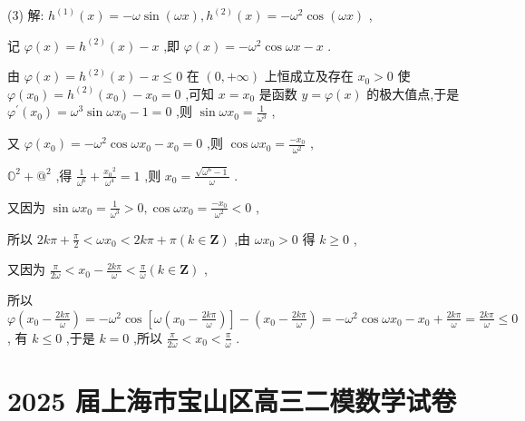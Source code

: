 \documentclass[10pt]{article}
\newcommand*\circled[1]{\tikz[baseline=(char.base)]{\node[shape=circle,draw,inner sep=1.5pt] (char) {\small #1};}}
\begin{document}
(3) 解: \({h}^{\left( 1\right) }\left( x\right)  =  - \omega \sin \left( {\omega x}\right) ,{h}^{\left( 2\right) }\left( x\right)  =  - {\omega }^{2}\cos \left( {\omega x}\right)\) ,

记 \(\varphi \left( x\right)  = {h}^{\left( 2\right) }\left( x\right)  - x\) ,即 \(\varphi \left( x\right)  =  - {\omega }^{2}\cos {\omega x} - x\) .

由 \(\varphi \left( x\right)  = {h}^{\left( 2\right) }\left( x\right)  - x \leq  0\) 在 \(\left( {0, + \infty }\right)\) 上恒成立及存在 \({x}_{0} > 0\) 使 \(\varphi \left( {x}_{0}\right)  = {h}^{\left( 2\right) }\left( {x}_{0}\right)  - {x}_{0} = 0\) ,可知 \(x = {x}_{0}\) 是函数 \(y = \varphi \left( x\right)\) 的极大值点,于是 \({\varphi }^{\prime }\left( {x}_{0}\right)  = {\omega }^{3}\sin \omega {x}_{0} - 1 = 0\) ,则 \(\sin \omega {x}_{0} = \frac{1}{{\omega }^{3}}\)  \circled{1} ,

又 \(\varphi \left( {x}_{0}\right)  =  - {\omega }^{2}\cos \omega {x}_{0} - {x}_{0} = 0\) ,则 \(\cos \omega {x}_{0} = \frac{-{x}_{0}}{{\omega }^{2}}\)  \circled{2} ,

\({\mathbb{O}}^{2} + {@}^{2}\) ,得 \(\frac{1}{{\omega }^{6}} + \frac{{x}_{0}{}^{2}}{{\omega }^{4}} = 1\) ,则 \({x}_{0} = \frac{\sqrt{{\omega }^{6} - 1}}{\omega }\) .

又因为 \(\sin \omega {x}_{0} = \frac{1}{{\omega }^{3}} > 0,\cos \omega {x}_{0} = \frac{-{x}_{0}}{{\omega }^{2}} < 0\) ,

所以 \({2k\pi } + \frac{\pi }{2} < \omega {x}_{0} < {2k\pi } + \pi \left( {k \in  \mathbf{Z}}\right)\) ,由 \(\omega {x}_{0} > 0\) 得 \(k \geq  0\) ,

又因为 \(\frac{\pi }{2\omega } < {x}_{0} - \frac{2k\pi }{\omega } < \frac{\pi }{\omega }\left( {k \in  \mathbf{Z}}\right)\) ,

所以 \(\varphi \left( {{x}_{0} - \frac{2k\pi }{\omega }}\right)  =  - {\omega }^{2}\cos \left\lbrack  {\omega \left( {{x}_{0} - \frac{2k\pi }{\omega }}\right) }\right\rbrack   - \left( {{x}_{0} - \frac{2k\pi }{\omega }}\right)  =  - {\omega }^{2}\cos \omega {x}_{0} - {x}_{0} + \frac{2k\pi }{\omega } = \frac{2k\pi }{\omega } \leq  0\) , 有 \(k \leq  0\) ,于是 \(k = 0\) ,所以 \(\frac{\pi }{2\omega } < {x}_{0} < \frac{\pi }{\omega }\) .

\section*{2025 届上海市宝山区高三二模数学试卷}
\end{document}
